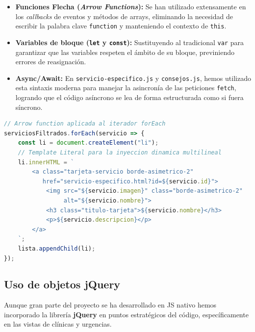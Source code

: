 \documentclass[11pt]{article}
\begin{document}
\begin{itemize}
    \item \textbf{Funciones Flecha (\textit{Arrow Functions}):} Se han utilizado extensamente en los \textit{callbacks} de eventos y métodos de arrays, eliminando la necesidad de escribir la palabra clave \texttt{function} y manteniendo el contexto de \texttt{this}.
    \item \textbf{Variables de bloque (\texttt{let} y \texttt{const}):} Sustituyendo al tradicional \texttt{var} para garantizar que las variables respeten el ámbito de su bloque, previniendo errores de reasignación.
    \item \textbf{Async/Await:} En \texttt{servicio-especifico.js} y \texttt{consejos.js}, hemos utilizado esta sintaxis moderna para manejar la asincronía de las peticiones \texttt{fetch}, logrando que el código asíncrono se lea de forma estructurada como si fuera síncrono.
\end{itemize}

\begin{lstlisting}[language=JavaScript, caption=Ejemplo del uso de ES6 con Arrow Functions y Template Literals en servicios.js]
// Arrow function aplicada al iterador forEach
serviciosFiltrados.forEach(servicio => {
    const li = document.createElement("li");
    // Template Literal para la inyeccion dinamica multilineal
    li.innerHTML = `
        <a class="tarjeta-servicio borde-asimetrico-2"
           href="servicio-especifico.html?id=${servicio.id}">
            <img src="${servicio.imagen}" class="borde-asimetrico-2"
                 alt="${servicio.nombre}">
            <h3 class="titulo-tarjeta">${servicio.nombre}</h3>
            <p>${servicio.descripcion}</p>
        </a>
    `;
    lista.appendChild(li);
});
\end{lstlisting}

\subsection{Uso de objetos jQuery}

Aunque gran parte del proyecto se ha desarrollado en JS nativo hemos incorporado la librería \textbf{jQuery} en puntos estratégicos del código, específicamente en las vistas de clínicas y urgencias.
\end{document}
